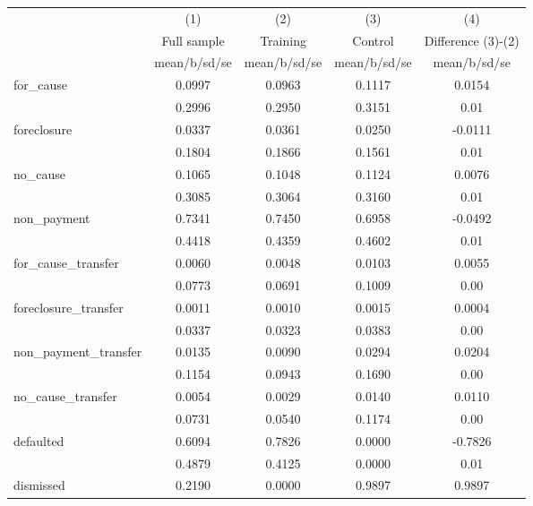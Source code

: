 {
\def\sym#1{\ifmmode^{#1}\else\(^{#1}\)\fi}
\begin{tabular}{l*{4}{c}}
\hline\hline
            &\multicolumn{1}{c}{(1)}&\multicolumn{1}{c}{(2)}&\multicolumn{1}{c}{(3)}&\multicolumn{1}{c}{(4)}\\
            &\multicolumn{1}{c}{Full sample}&\multicolumn{1}{c}{Training}&\multicolumn{1}{c}{Control}&\multicolumn{1}{c}{Difference (3)-(2)}\\
            &mean/b/sd/se&mean/b/sd/se&mean/b/sd/se&mean/b/sd/se\\
\hline
for\_cause   &     0.0997 &     0.0963 &     0.1117 &      0.0154\\
            &     0.2996 &     0.2950 &     0.3151 &        0.01\\
foreclosure &     0.0337 &     0.0361 &     0.0250 &     -0.0111\\
            &     0.1804 &     0.1866 &     0.1561 &        0.01\\
no\_cause    &     0.1065 &     0.1048 &     0.1124 &      0.0076\\
            &     0.3085 &     0.3064 &     0.3160 &        0.01\\
non\_payment &     0.7341 &     0.7450 &     0.6958 &     -0.0492\\
            &     0.4418 &     0.4359 &     0.4602 &        0.01\\
for\_cause\_transfer&     0.0060 &     0.0048 &     0.0103 &      0.0055\\
            &     0.0773 &     0.0691 &     0.1009 &        0.00\\
foreclosure\_transfer&     0.0011 &     0.0010 &     0.0015 &      0.0004\\
            &     0.0337 &     0.0323 &     0.0383 &        0.00\\
non\_payment\_transfer&     0.0135 &     0.0090 &     0.0294 &      0.0204\\
            &     0.1154 &     0.0943 &     0.1690 &        0.00\\
no\_cause\_transfer&     0.0054 &     0.0029 &     0.0140 &      0.0110\\
            &     0.0731 &     0.0540 &     0.1174 &        0.00\\
defaulted   &     0.6094 &     0.7826 &     0.0000 &     -0.7826\\
            &     0.4879 &     0.4125 &     0.0000 &        0.01\\
dismissed   &     0.2190 &     0.0000 &     0.9897 &      0.9897\\

\end{tabular}}
